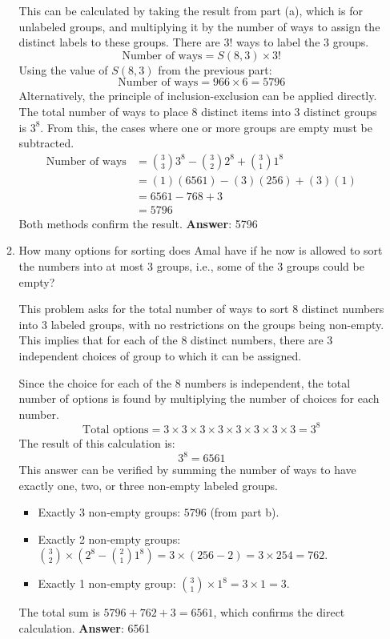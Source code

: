 \documentclass{article}
\begin{document}
\begin{enumerate}
\begin{enumerate}
\begin{answer}
      This can be calculated by taking the result from part (a), which is for unlabeled groups, and multiplying it by the number of ways to assign the distinct labels to these groups. There are $3!$ ways to label the 3 groups.
      $$ \text{Number of ways} = S(8, 3) \times 3! $$
      Using the value of $S(8, 3)$ from the previous part:
      $$ \text{Number of ways} = 966 \times 6 = 5796 $$
      Alternatively, the principle of inclusion-exclusion can be applied directly. The total number of ways to place 8 distinct items into 3 distinct groups is $3^8$. From this, the cases where one or more groups are empty must be subtracted.
      \begin{align*}
        \text{Number of ways} &= \binom{3}{3}3^8 - \binom{3}{2}2^8 + \binom{3}{1}1^8 \\
        &= (1)(6561) - (3)(256) + (3)(1) \\
        &= 6561 - 768 + 3 \\
        &= 5796
      \end{align*}
      Both methods confirm the result.
      \newline\newline
      \textbf{Answer}: 5796
    \end{answer}
    \item How many options for sorting does Amal have if he now is allowed to sort the numbers into at most 3 groups, i.e., some of the 3 groups could be empty?
    \begin{answer}
      This problem asks for the total number of ways to sort 8 distinct numbers into 3 labeled groups, with no restrictions on the groups being non-empty. This implies that for each of the 8 distinct numbers, there are 3 independent choices of group to which it can be assigned.

      Since the choice for each of the 8 numbers is independent, the total number of options is found by multiplying the number of choices for each number.
      $$ \text{Total options} = 3 \times 3 \times 3 \times 3 \times 3 \times 3 \times 3 \times 3 = 3^8 $$
      The result of this calculation is:
      $$ 3^8 = 6561 $$
      This answer can be verified by summing the number of ways to have exactly one, two, or three non-empty labeled groups.
      \begin{itemize}
        \item Exactly 3 non-empty groups: $5796$ (from part b).
        \item Exactly 2 non-empty groups: $\binom{3}{2} \times (2^8 - \binom{2}{1}1^8) = 3 \times (256 - 2) = 3 \times 254 = 762$.
        \item Exactly 1 non-empty group: $\binom{3}{1} \times 1^8 = 3 \times 1 = 3$.
      \end{itemize}
      The total sum is $5796 + 762 + 3 = 6561$, which confirms the direct calculation.
      \newline\newline
      \textbf{Answer}: 6561
    \end{answer}
  \end{enumerate}




\end{enumerate}
\end{document}
